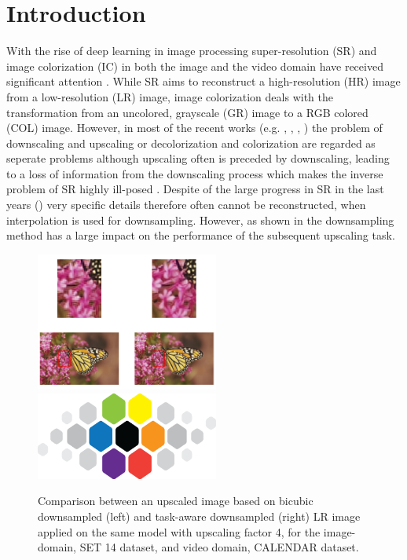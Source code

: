 \newpage
\section{Introduction}
\label{sec:Introduction}
With the rise of deep learning in image processing super-resolution (SR) and image
colorization (IC) in both the image and the video domain have received significant
attention \cite{DLFISRAS}. While SR aims to reconstruct a high-resolution (HR)
image from a low-resolution (LR) image, image colorization deals with the
transformation from an uncolored, grayscale (GR) image to a RGB colored
(COL) image.
However, in most of the recent works (e.g. \cite{AFPATSISR}, \cite{ESRGAN},
\cite{RBPNFVSR}, \cite{LFVSRTHROFE}) the problem of downscaling and upscaling
or decolorization and colorization are regarded as seperate problems although
upscaling often is preceded by downscaling, leading to a loss of information
from the downscaling process which makes the inverse problem of SR highly
ill-posed \cite{TAID}. Despite of the large progress in SR in the last years
(\cite{DLFISRAS}) very specific details therefore often cannot be reconstructed,
when interpolation is used for downsampling. However, as shown in
 the downsampling method has a large impact on
the performance of the subsequent upscaling task.

\begin{figure}[!htbp]
	\centering
	\includegraphics[width=6cm]{figures/shrb_vs_shrt_x4}
  \includegraphics[width=6cm]{figures/cvl}
	\caption{Comparison between an upscaled image based on bicubic downsampled
  (left) and task-aware downsampled (right) LR image applied on the same model
  with upscaling factor 4, for the image-domain, SET 14 dataset, and video
  domain, CALENDAR dataset. }
  \label{fig:shrb_vs_shrt_x4}
\end{figure}

